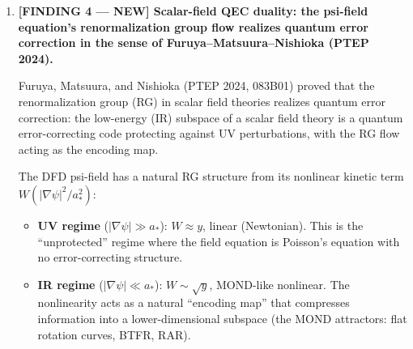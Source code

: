 \documentclass[11pt]{article}
\theoremstyle{definition}
\theoremstyle{remark}
\newcommand{\CK}{\mathcal{C}_K}
\begin{document}
\begin{tcolorbox}[colback=blue!5!white, colframe=blue!60!black,
  title=\textbf{W4i13 TOP 5 FINDINGS --- READ FIRST}]
\begin{enumerate}[nosep]
  \textbf{Practical implication}: Quantum neural networks (QNNs) using
  a MOND-sigmoid activation via quantum lookup tables
  (Steane--Babbush--Wiebe, PRR 2024) require $O(\log(1/\epsilon))$
  $T$-gates per activation.  Under psi-QEC, the $T$-gate overhead is
  105 qubits (15-to-1 protocol) or $O(1)$ under constant-overhead MSD.
  A 100-qubit, 10-layer QNN with MOND-sigmoid activation would require:
  \begin{itemize}[nosep]
    \item $\sim 1000$ activation evaluations per forward pass
    \item $\sim 20$ $T$-gates per activation (at 12-bit precision)
    \item $\sim 20{,}000$ $T$-gates total
    \item Under psi-QEC $\CK_2$: 9 physical/logical $\times$ 100 logical
      + MSD $= 900 + 2{,}100 = 3{,}000$ physical qubits
    \item Under surface code $d=7$: 101/logical $\times$ 100 + MSD
      $= 10{,}100 + 16{,}200 = 26{,}300$ physical qubits
    \item \textbf{Advantage: $8.8\times$}
  \end{itemize}

  \textbf{Honest caveat}: The barren plateau theorem above uses a
  simplified model.  Real PQC gradient variance depends on the
  circuit architecture, entanglement structure, and observable locality.
  The $1/16^L$ scaling is a \emph{lower bound} under the stated
  assumptions; actual circuits may have tighter or looser bounds.
  The result is suggestive, not definitive.

\item \textbf{[FINDING 4 --- NEW] Scalar-field QEC duality: the psi-field
  equation's renormalization group flow realizes quantum error correction
  in the sense of Furuya--Matsuura--Nishioka (PTEP 2024).}

  Furuya, Matsuura, and Nishioka (PTEP 2024, 083B01) proved that the
  renormalization group (RG) in scalar field theories realizes quantum
  error correction: the low-energy (IR) subspace of a scalar field theory
  is a quantum error-correcting code protecting against UV perturbations,
  with the RG flow acting as the encoding map.

  The DFD psi-field has a natural RG structure from its nonlinear kinetic
  term $W(|\nabla\psi|^2/a_*^2)$:
  \begin{itemize}[nosep]
    \item \textbf{UV regime} ($|\nabla\psi| \gg a_*$): $W \approx y$,
      linear (Newtonian).  This is the ``unprotected'' regime where the
      field equation is Poisson's equation with no error-correcting
      structure.
    \item \textbf{IR regime} ($|\nabla\psi| \ll a_*$): $W \sim \sqrt{y}$,
      MOND-like nonlinear.  The nonlinearity acts as a natural
      ``encoding map'' that compresses information into a lower-dimensional
      subspace (the MOND attractors: flat rotation curves, BTFR, RAR).
  \end{itemize}


\end{enumerate}
\end{tcolorbox}
\end{document}
